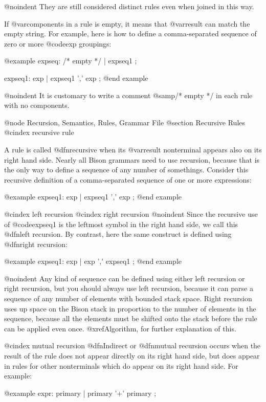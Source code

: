{{{{{{{{{{{{{{{{{{@noindent
They are still considered distinct rules even when joined in this way.

If @var{components} in a rule is empty, it means that @var{result} can
match the empty string.  For example, here is how to define a
comma-separated sequence of zero or more @code{exp} groupings:

@example
expseq:   /* empty */
        | expseq1
        ;

expseq1:  exp
        | expseq1 ',' exp
        ;
@end example

@noindent
It is customary to write a comment @samp{/* empty */} in each rule
with no components.

@node Recursion, Semantics, Rules, Grammar File
@section Recursive Rules
@cindex recursive rule

A rule is called @dfn{recursive} when its @var{result} nonterminal appears
also on its right hand side.  Nearly all Bison grammars need to use
recursion, because that is the only way to define a sequence of any number
of somethings.  Consider this recursive definition of a comma-separated
sequence of one or more expressions:

@example
expseq1:  exp
        | expseq1 ',' exp
        ;
@end example

@cindex left recursion
@cindex right recursion
@noindent
Since the recursive use of @code{expseq1} is the leftmost symbol in the
right hand side, we call this @dfn{left recursion}.  By contrast, here
the same construct is defined using @dfn{right recursion}:

@example
expseq1:  exp
        | exp ',' expseq1
        ;
@end example

@noindent
Any kind of sequence can be defined using either left recursion or right
recursion, but you should always use left recursion, because it can parse a
sequence of any number of elements with bounded stack space.  Right
recursion uses up space on the Bison stack in proportion to the number of
elements in the sequence, because all the elements must be shifted onto the
stack before the rule can be applied even once.  @xref{Algorithm},
for further explanation of this.

@cindex mutual recursion
@dfn{Indirect} or @dfn{mutual} recursion occurs when the result of the
rule does not appear directly on its right hand side, but does appear
in rules for other nonterminals which do appear on its right hand
side.  For example:

@example
expr:     primary
        | primary '+' primary
        ;

}}}}}}}}}}}}}}}}}}
